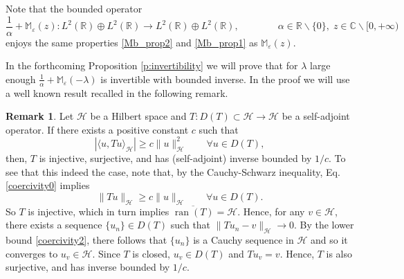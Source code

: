 \documentclass[a4paper,11pt,reqno]{amsart}
\theoremstyle{definition}
\newtheorem{remark}[theorem]{Remark}
\numberwithin{equation}{section}
\newcommand{\ran}{\operatorname{ran }}
\newcommand{\CO}{\mathbb C}
\newcommand{\RE}{\mathbb R}
\newcommand{\Mb}{\mathbb M}
\newcommand{\Hil}{\mathscr{H}}
\newcommand{\ve}{\varepsilon}
\begin{document}
Note that the bounded operator 
\[
\frac1{\alpha }+\Mb_{ \ve}(z) :  L^2(\RE)\oplus L^2(\RE) \to  L^2(\RE)\oplus L^2(\RE) , \qquad 
\qquad \alpha \in  \RE\backslash\{0\} ,\; z\in \CO\backslash[0,+\infty)
\]
enjoys the same properties \eqref{Mb_prop2} and \eqref{Mb_prop1} as $\Mb_{\ve}(z)$.

In the forthcoming Proposition \ref{p:invertibility} we will prove that for $\lambda$ large enough $\frac1{\alpha }+\Mb_{ \ve}(-\lambda)$ is invertible with bounded inverse. In the proof we will use a well known result  recalled in the following remark.
\begin{remark}\label{r:invertibility} Let $\Hil$ be a  Hilbert space and $T:D(T)\subset 
\Hil \to \Hil$ be a self-adjoint operator. If there exists a positive constant $c$ such that 
\begin{equation}\label{coercivity0}
\left|\langle u, T u \rangle_{\Hil }\right| \geq c \|u\|^2_{\Hil }\qquad \forall u \in D(T), 
\end{equation}
then, $T$ is injective, surjective, and has (self-adjoint) inverse bounded by $1/c$. To see that this indeed the case, note that, by the Cauchy-Schwarz inequality, Eq. \eqref{coercivity0} implies 
\begin{equation}\label{coercivity2}
\|Tu\|_{\Hil } \geq c \|u\|_{\Hil} \qquad \forall u \in D(T) .
\end{equation}
So $T$  is injective, which in turn implies $\overline{\ran(T)} =\Hil$. Hence, for any $v\in\Hil $, there exists a sequence $\{u_n\} \in D(T) $ such that $\|T u_n  - v\|_{ \Hil } \to 0$. By the lower bound \eqref{coercivity2}, there follows that $\{u_n\}$ is a Cauchy sequence in $\Hil $ and so  it converges to $u_v\in \Hil $. Since $T$ is closed,  $u_v \in D(T)$ and $Tu_v = v$. Hence, $T$ is also surjective, and has inverse bounded by $1/c$.
\end{remark}
\end{document}
